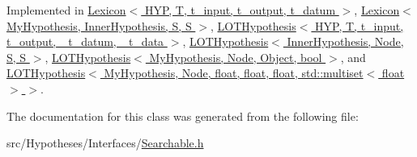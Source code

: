 Implemented in \hyperlink{class_lexicon_abccf49d0f313b9f6e0c3ae286d13ac82}{Lexicon$<$ H\+Y\+P, T, t\+\_\+input, t\+\_\+output, t\+\_\+datum $>$}, \hyperlink{class_lexicon_abccf49d0f313b9f6e0c3ae286d13ac82}{Lexicon$<$ My\+Hypothesis, Inner\+Hypothesis, S, S $>$}, \hyperlink{class_l_o_t_hypothesis_ac74e874f6b677dc1c013602907627be7}{L\+O\+T\+Hypothesis$<$ H\+Y\+P, T, t\+\_\+input, t\+\_\+output, \+\_\+t\+\_\+datum, \+\_\+t\+\_\+data $>$}, \hyperlink{class_l_o_t_hypothesis_ac74e874f6b677dc1c013602907627be7}{L\+O\+T\+Hypothesis$<$ Inner\+Hypothesis, Node, S, S $>$}, \hyperlink{class_l_o_t_hypothesis_ac74e874f6b677dc1c013602907627be7}{L\+O\+T\+Hypothesis$<$ My\+Hypothesis, Node, Object, bool $>$}, and \hyperlink{class_l_o_t_hypothesis_ac74e874f6b677dc1c013602907627be7}{L\+O\+T\+Hypothesis$<$ My\+Hypothesis, Node, float, float, float, std\+::multiset$<$ float $>$ $>$}.



The documentation for this class was generated from the following file\+:\begin{DoxyCompactItemize}
\item 
src/\+Hypotheses/\+Interfaces/\hyperlink{_searchable_8h}{Searchable.\+h}\end{DoxyCompactItemize}
